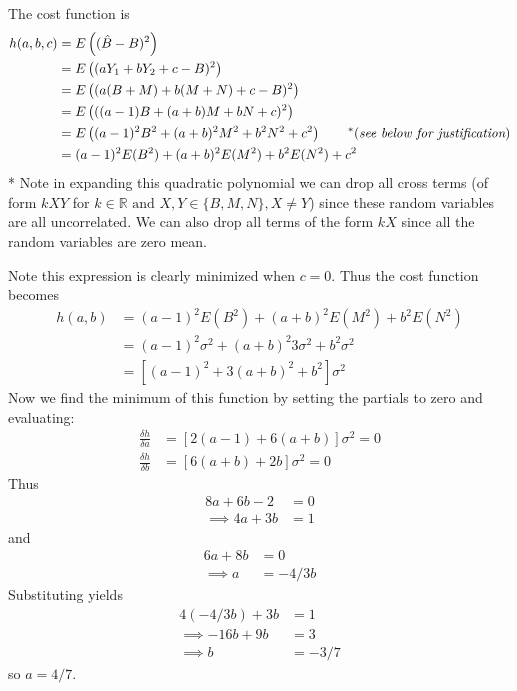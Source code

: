 \documentclass[paper=a4, fontsize=11pt]{scrartcl} %
\numberwithin{equation}{section} %
\numberwithin{figure}{section} %
\numberwithin{table}{section} %
\begin{document}
The cost function is
\begin{align*}
h(a,b,c) &= E\left( (\hat{B} - B)^2 \right) \\
   &= E\left( (aY_1 + bY_2 + c - B)^2 \right) \\
   &= E\left( (a(B+M) + b(M+N) + c - B)^2 \right) \\
   &= E\left( ((a-1) B + (a+b) M + bN + c)^2 \right) \\
   &= E\left( (a-1)^2 B^2 + (a+b)^2 M^2 + b^2 N^2 + c^2 \right) \qquad{^*(\emph{see below for justification})}\\
   &= (a-1)^2 E(B^2) + (a+b)^2 E(M^2) + b^2 E(N^2) + c^2
\end{align*}
  * Note in expanding this quadratic polynomial we can drop all cross terms (of form $kXY$ for $k \in \mathbb{R} \textrm{ and } X, Y \in \{B, M, N\}, X \ne Y$) since these random variables are all uncorrelated. We can also drop all terms of the form $kX$ since all the random variables are zero mean.
  
Note this expression is clearly minimized when $c = 0$. Thus the cost function becomes
\begin{align*}
h(a,b) &= (a-1)^2 E(B^2) + (a+b)^2 E(M^2) + b^2 E(N^2) \\
   &= (a-1)^2 \sigma^2 + (a+b)^2 3 \sigma^2 + b^2 \sigma^2 \\
   &= \left[ (a-1)^2 + 3(a+b)^2 + b^2\right] \sigma^2
\end{align*}
Now we find the minimum of this function by setting the partials to zero and evaluating:
\begin{align*}
\frac{\delta h}{\delta a} &= \left[ 2(a-1) + 6(a+b) \right] \sigma^2 = 0 \\
\frac{\delta h}{\delta b} &= \left[ 6(a+b) +2b \right] \sigma^2 = 0
\end{align*}
Thus 
\begin{align*}
8a + 6b - 2 &= 0 \\
\implies 4a + 3b &= 1
\end{align*}
and
\begin{align*}
6a + 8b &= 0 \\
\implies a &= -4/3 b
\end{align*}
Substituting yields
\begin{align*}
4(-4/3b) + 3b &= 1 \\
\implies -16b + 9b &= 3\\
\implies b &= -3/7
\end{align*}
so $a = 4/7$. 
\end{document}
